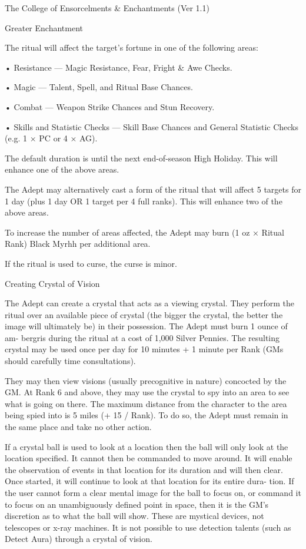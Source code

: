 \begin{Chapter}{The College of Ensorcelments \& Enchantments (Ver 1.1)}
\begin{ritual}[Q-1]{Greater Enchantment}
\begin{effects}
The ritual will affect the target’s fortune in one of 
the following areas:  

• Resistance — Magic Resistance, Fear, Fright \& Awe Checks.

• Magic — Talent, Spell, and Ritual Base Chances.

• Combat — Weapon Strike Chances and Stun Recovery.

• Skills and Statistic Checks — Skill Base Chances and General
Statistic Checks (e.g.  1 × PC or 4 × AG).

The default duration is until the next end-of-season High Holiday.
This will enhance one of the above areas.

The Adept may alternatively cast a form of the ritual that will affect
5 targets for 1 day (plus 1 day OR 1 target per 4 full ranks).  This
will enhance two of the above areas.

To increase the number of areas affected, the Adept may burn (1 oz ×
Ritual Rank) Black Myrhh per additional area.

If the ritual is used to curse, the curse is minor.
\end{effects}
\end{ritual}

\begin{ritual}[Q-2]{Creating Crystal of Vision}

\begin{effects}
The Adept can create a crystal that acts as a viewing crystal.  They
perform the ritual over an available piece of crystal (the bigger the
crystal, the better the image will ultimately be) in their possession.
The Adept must burn 1 ounce of am- bergris during the ritual at a cost
of 1,000 Silver Pennies.  The resulting crystal may be used once per
day for 10 minutes + 1 minute per Rank (GMs should carefully time
consultations).

They may then view visions (usually precognitive in nature) concocted
by the GM.  At Rank 6 and above, they may use the crystal to spy into
an area to see what is going on there.  The maximum distance from the
character to the area being spied into is 5 miles (+ 15 / Rank). To do
so, the Adept must remain in the same place and take no other action.

If a crystal ball is used to look at a location then the ball will
only look at the location specified.  It cannot then be commanded to
move around. It will enable the observation of events in that location
for its duration and will then clear. Once started, it will continue
to look at that location for its entire dura- tion.  If the user
cannot form a clear mental image for the ball to focus on, or command
it to focus on an unambiguously defined point in space, then it is the
GM’s discretion as to what the ball will show.  These are mystical
devices, not telescopes or x-ray machines. It is not possible to use
detection talents (such as Detect Aura) through a crystal of vision.
\end{effects}
\end{ritual}


\end{Chapter}
